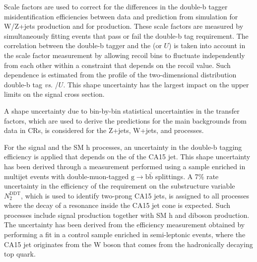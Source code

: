 Scale factors are used to correct for the differences in the double-b tagger misidentification efficiencies between data and prediction from simulation for W/Z+jets production and for \ttbar production. These scale factors are measured by simultaneously fitting events that pass or fail the double-b tag requirement. The correlation between the double-b tagger and the \ptmiss (or $U$) is taken into account in the scale factor measurement by allowing recoil bins to fluctuate independently from each other within a constraint that depends on the recoil value. Such dependence is estimated from the profile of the two-dimensional distribution double-b tag {\it vs.\/} \ptmiss/$U$. This shape uncertainty has the largest impact on the upper limits on the signal cross section.

A shape uncertainty due to bin-by-bin statistical uncertainties in the transfer factors, which are used to derive the predictions for the main backgrounds from data in CRs, is considered for the Z+jets, W+jets, and \ttbar processes.

For the signal and the SM h processes, an uncertainty in the double-b tagging efficiency is applied that depends on the \pt of the CA15 jet. This shape uncertainty has been derived through a measurement performed using a sample enriched in multijet events with double-muon-tagged $\text{g}\to\text{b}\bar{\text{b}}$ splittings. A 7\% rate uncertainty in the efficiency of the requirement on the substructure variable $N_2^\text{DDT}$, which is used to identify two-prong CA15 jets, is assigned to all processes where the decay of a resonance inside the CA15 jet cone is expected. Such processes include signal production together with SM h and diboson production. The uncertainty has been derived from the efficiency measurement obtained by performing a fit in a control sample enriched in semi-leptonic \ttbar events, where the CA15 jet originates from the W boson that comes from the hadronically decaying top quark. 


